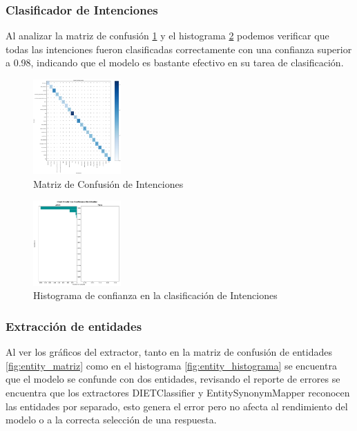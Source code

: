 \subsubsection{Clasificador de Intenciones}
Al analizar la matriz de confusión \ref{fig:intent_matriz} y el histograma
\ref{fig:intent_histograma} podemos verificar que todas las intenciones fueron clasificadas
correctamente con una confianza superior a 0.98, indicando que el modelo es bastante efectivo en su
tarea de clasificación.
\begin{figure}[H]
	\centering
	\includegraphics[angle=0,width=0.3\textwidth]{Figuras/intent_confusion_matrix.png}
	\caption{Matriz de Confusión de Intenciones}
	\label{fig:intent_matriz}
\end{figure}

\begin{figure}[H]
	\centering
	\includegraphics[angle=0,width=0.3\textwidth]{Figuras/intent_histogram.png}
	\caption{Histograma de confianza en la clasificación de Intenciones}
	\label{fig:intent_histograma}
\end{figure}
\subsubsection{Extracción de entidades}
Al ver los gráficos del extractor, tanto en la matriz de confusión de entidades
\ref{fig:entity_matriz} como en el histograma \ref{fig:entity_histograma} se encuentra que el
modelo se confunde con dos entidades, revisando el reporte de errores se encuentra que los
extractores DIETClassifier y EntitySynonymMapper reconocen las entidades por separado, esto genera
el error pero no afecta al rendimiento del modelo o a la correcta selección de una respuesta.

